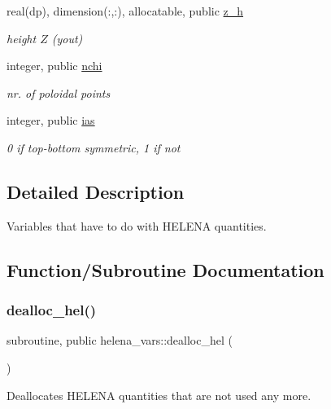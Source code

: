 \begin{DoxyCompactItemize}
real(dp), dimension(\+:,\+:), allocatable, public \hyperlink{namespacehelena__vars_a41e897edb2a8b34fa7bde28ff57d012a}{z\+\_\+h}
\begin{DoxyCompactList}\small\item\em height $Z$ (yout) \end{DoxyCompactList}\item 
integer, public \hyperlink{namespacehelena__vars_a0489f36c6549c35a745ec6d540940d93}{nchi}
\begin{DoxyCompactList}\small\item\em nr. of poloidal points \end{DoxyCompactList}\item 
integer, public \hyperlink{namespacehelena__vars_a009c168bb16124399a6059f7a6107a56}{ias}
\begin{DoxyCompactList}\small\item\em 0 if top-\/bottom symmetric, 1 if not \end{DoxyCompactList}\end{DoxyCompactItemize}


\subsection{Detailed Description}
Variables that have to do with H\+E\+L\+E\+NA quantities. 

\subsection{Function/\+Subroutine Documentation}
\mbox{\label{namespacehelena__vars_add7b3eea7306eca7fb45737ff915523f}} 
\subsubsection{\texorpdfstring{dealloc\+\_\+hel()}{dealloc\_hel()}}
{\footnotesize\ttfamily subroutine, public helena\+\_\+vars\+::dealloc\+\_\+hel (\begin{DoxyParamCaption}{ }\end{DoxyParamCaption})}



Deallocates H\+E\+L\+E\+NA quantities that are not used any more. 



